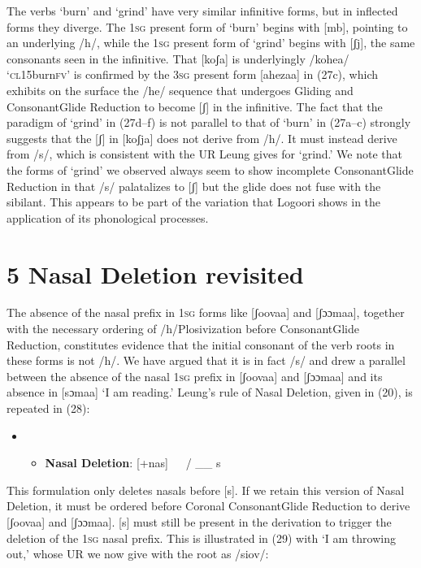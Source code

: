 \documentclass[output=paper]{langsci/langscibook}
\begin{document}
The verbs ‘burn’ and ‘grind’ have very similar infinitive forms, but in inflected forms they diverge. The 1\textsc{sg} present form of ‘burn’ begins with [mb], pointing to an underlying /h/, while the 1\textsc{sg} present form of ‘grind’ begins with [ʃj], the same consonants seen in the infinitive. That [koʃa] is underlyingly /kohea/ ‘\textsc{cl}15burn\textsc{fv’} is confirmed by the 3\textsc{sg} present form [ahezaa] in (27c), which exhibits on the surface the /he/ sequence that undergoes Gliding and ConsonantGlide Reduction to become [ʃ] in the infinitive. The fact that the paradigm of ‘grind’ in (27d–f) is not parallel to that of ‘burn’ in (27a–c) strongly suggests that the [ʃ] in [koʃja] does not derive from /h/. It must instead derive from /s/, which is consistent with the UR Leung gives for ‘grind.’ We note that the forms of ‘grind’ we observed always seem to show incomplete ConsonantGlide Reduction in that /s/ palatalizes to [ʃ] but the glide does not fuse with the sibilant. This appears to be part of the variation that Logoori shows in the application of its phonological processes.

\chapter{5 Nasal Deletion revisited}

The absence of the nasal prefix in 1\textsc{sg }forms like [ʃoovaa] and [ʃɔɔmaa], together with the necessary ordering of /h/Plosivization before ConsonantGlide Reduction, constitutes evidence that the initial consonant of the verb roots in these forms is not /h/. We have argued that it is in fact /s/ and drew a parallel between the absence of the nasal 1\textsc{sg }prefix in [ʃoovaa] and [ʃɔɔmaa] and its absence in [sɔmaa] ‘I am reading.’ Leung’s rule of Nasal Deletion, given in (20), is repeated in (28):

\setcounter{itemize}{0}
\begin{itemize}
\item \setcounter{itemize}{0}
\begin{itemize}
\item \textbf{Nasal Deletion}: [+nas]   / \_\_ s

\end{itemize}
\end{itemize}

This formulation only deletes nasals before [s]. If we retain this version of Nasal Deletion, it must be ordered before Coronal ConsonantGlide Reduction to derive [ʃoovaa] and [ʃɔɔmaa]. [s] must still be present in the derivation to trigger the deletion of the 1\textsc{sg} nasal prefix. This is illustrated in (29) with ‘I am throwing out,’ whose UR we now give with the root as /siov/:
\end{document}
